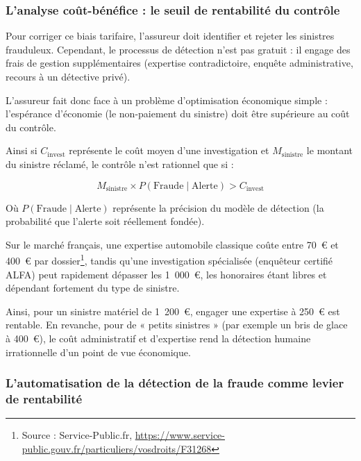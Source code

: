 \subsubsection{L'analyse coût-bénéfice : le seuil de rentabilité du contrôle}

Pour corriger ce biais tarifaire, l'assureur doit identifier et rejeter les sinistres frauduleux. Cependant, le processus de détection n'est pas gratuit : il engage des frais de gestion supplémentaires (expertise contradictoire, enquête administrative, recours à un détective privé).

L'assureur fait donc face à un problème d'optimisation économique simple : l'espérance d'économie (le non-paiement du sinistre) doit être supérieure au coût du contrôle.

Ainsi si $C_{\text{invest}}$ représente le coût moyen d'une investigation et $M_{\text{sinistre}}$ le montant du sinistre réclamé, le contrôle n'est rationnel que si :

\begin{equation}
    M_{\text{sinistre}} \times P(\text{Fraude} \mid \text{Alerte}) > C_{\text{invest}}
\end{equation}

Où $P(\text{Fraude} \mid \text{Alerte})$ représente la précision du modèle de détection (la probabilité que l'alerte soit réellement fondée).

Sur le marché français, une expertise automobile classique coûte entre 70~\euro{} et 400~\euro{} par dossier\footnote{Source : Service-Public.fr, \url{https://www.service-public.gouv.fr/particuliers/vosdroits/F31268}}, tandis qu'une investigation spécialisée (enquêteur certifié ALFA) peut rapidement dépasser les 1~000~\euro{}, les honoraires étant libres et dépendant fortement du type de sinistre.

Ainsi, pour un sinistre matériel de 1~200~\euro{}, engager une expertise à 250~\euro{} est rentable. En revanche, pour de « petits sinistres » (par exemple un bris de glace à 400~\euro{}), le coût administratif et d'expertise rend la détection humaine irrationnelle d'un point de vue économique.

\subsubsection{L'automatisation de la détection de la fraude comme levier de rentabilité}

